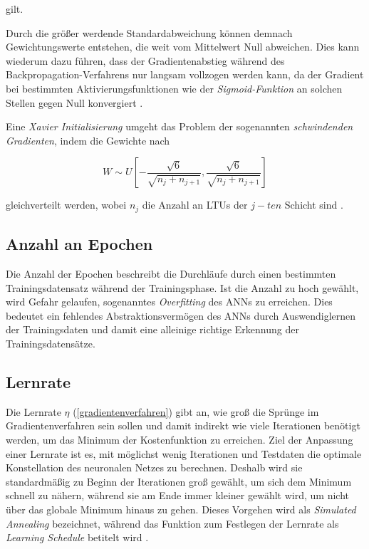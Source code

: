 gilt.

Durch die größer werdende Standardabweichung können demnach Gewichtungswerte entstehen, die weit vom Mittelwert Null abweichen. Dies kann wiederum dazu führen, dass der Gradientenabstieg während des Backpropagation-Verfahrens nur langsam vollzogen werden kann, da der Gradient bei bestimmten Aktivierungsfunktionen wie der \textit{Sigmoid-Funktion} an solchen Stellen gegen Null konvergiert \cite{AurelienGeron.2018}. 

Eine \textit{Xavier Initialisierung} umgeht das Problem der sogenannten \textit{schwindenden Gradienten}, indem die Gewichte nach

\begin{equation} \label{xavier}
W \sim U[-\frac{\sqrt{6}}{\sqrt{n_{j} + n_{j+1}}},\frac{\sqrt{6}}{\sqrt{n_{j} + n_{j+1}}}]
\end{equation}

gleichverteilt werden, wobei $n_{j}$ die Anzahl an LTUs der $j-ten$ Schicht sind \cite{XavierGlorot.2010}.

\subsection*{Anzahl an Epochen}

Die Anzahl der Epochen beschreibt die Durchläufe durch einen bestimmten Trainingsdatensatz während der Trainingsphase. Ist die Anzahl zu hoch gewählt, wird Gefahr gelaufen, sogenanntes \textit{Overfitting} des ANNs zu erreichen. Dies bedeutet ein fehlendes Abstraktionsvermögen des ANNs durch \glqq Auswendiglernen\grqq{} der Trainingsdaten und damit eine alleinige richtige Erkennung der Trainingsdatensätze.  

\subsection*{Lernrate}

Die Lernrate $\eta$ (\ref{gradientenverfahren}) gibt an, wie groß die Sprünge im Gradientenverfahren sein sollen und damit indirekt wie viele Iterationen benötigt werden, um das Minimum der Kostenfunktion zu erreichen. Ziel der Anpassung einer Lernrate ist es, mit möglichst wenig Iterationen und Testdaten die optimale Konstellation des neuronalen Netzes zu berechnen. Deshalb wird sie standardmäßig zu Beginn der Iterationen groß gewählt, um sich dem Minimum schnell zu nähern, während sie am Ende immer kleiner gewählt wird, um nicht über das globale Minimum hinaus zu gehen. Dieses Vorgehen wird als \textit{Simulated Annealing} bezeichnet, während das Funktion zum Festlegen der Lernrate als \textit{Learning Schedule} betitelt wird \cite{AurelienGeron.2018}.

